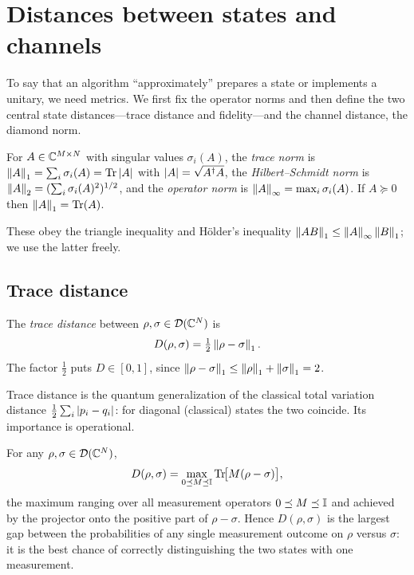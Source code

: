 \section{Distances between states and channels}
\label{sec:lec02-2}

To say that an algorithm ``approximately'' prepares a state or implements a
unitary, we need metrics. We first fix the operator norms and then define the two
central state distances---trace distance and fidelity---and the channel distance,
the diamond norm.

\begin{definition}\label{def:lec02-schatten}
For $A\in\mathbb{C}^{M\times N}$ with singular values $\sigma_i(A)$, the \emph{trace norm}
is $\left\lVert A \right\rVert_1=\sum_i\sigma_i(A)=\operatorname{Tr}\left\lvert A \right\rvert$ with $\left\lvert A \right\rvert=\sqrt{A^{\dagger} A}$, the
\emph{Hilbert--Schmidt norm} is $\left\lVert A \right\rVert_2=(\sum_i\sigma_i(A)^{2})^{1/2}$, and the
\emph{operator norm} is $\left\lVert A \right\rVert_\infty=\max_i\sigma_i(A)$. If $A\succeq0$ then
$\left\lVert A \right\rVert_1=\operatorname{Tr}(A)$.
\end{definition}

These obey the triangle inequality and H\"older's inequality
$\left\lVert AB \right\rVert_1\le\left\lVert A \right\rVert_\infty\left\lVert B \right\rVert_1$; we use the latter freely.

\subsection{Trace distance}

\begin{definition}\label{def:lec02-tracedist}
The \emph{trace distance} between $\rho,\sigma\in\mathcal{D}(\mathbb{C}^{N})$ is
\begin{equation}\label{eq:lec02-tracedist}
  D(\rho,\sigma)=\tfrac12\left\lVert \rho-\sigma \right\rVert_1 .
\end{equation}
The factor $\tfrac12$ puts $D\in[0,1]$, since
$\left\lVert \rho-\sigma \right\rVert_1\le\left\lVert \rho \right\rVert_1+\left\lVert \sigma \right\rVert_1=2$.
\end{definition}

Trace distance is the quantum generalization of the classical total variation
distance $\tfrac12\sum_i\left\lvert p_i-q_i \right\rvert$: for diagonal (classical) states the two
coincide. Its importance is operational.

\begin{theorem}\label{thm:lec02-op}
For any $\rho,\sigma\in\mathcal{D}(\mathbb{C}^{N})$,
\begin{equation}\label{eq:lec02-op}
  D(\rho,\sigma)=\max_{0\preceq M\preceq\mathbb{I}}\operatorname{Tr}\!\bigl[M(\rho-\sigma)\bigr],
\end{equation}
the maximum ranging over all measurement operators $0\preceq M\preceq\mathbb{I}$ and
achieved by the projector onto the positive part of $\rho-\sigma$. Hence
$D(\rho,\sigma)$ is the largest gap between the probabilities of any single
measurement outcome on $\rho$ versus $\sigma$: it is the best chance of correctly
distinguishing the two states with one measurement.
\end{theorem}

